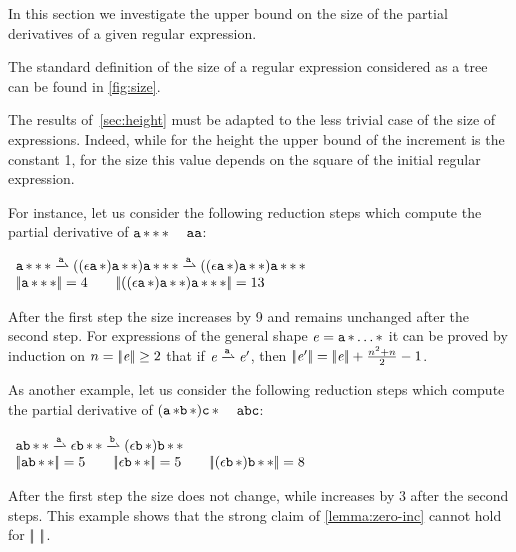 In this section we investigate the upper bound on the size of the partial derivatives of a given regular expression.

The standard definition of the size of a regular expression considered as a tree can be found in \cref{fig:size}.

The results of~\cref{sec:height} must be adapted to the less trivial case of the size of expressions. Indeed, while for the height the upper bound of the increment is the constant 1, for the size this value depends on the square of the initial regular expression.

For instance, let us consider the following reduction steps which compute the partial derivative of ${{{{{{\mathtt {a}}\mathop{*}}}\mathop{*}}}\mathop{*}}$
\wrt~ $\mathtt {a}\mathtt {a}$:
\begin{flushleft}
 $
  \begin{array}{l}
   \starop{\starop{\starop{\sym}}}\parDer{\sym}((\eps\catop\starop{\sym})\catop\starop{\starop{\sym}})\catop\starop{\starop{\starop{\sym}}}\parDer{\sym}((\eps\catop\starop{\sym})\catop\starop{\starop{\sym}})\catop\starop{\starop{\starop{\sym}}} \\
   \tsize{\starop{\starop{\starop{\sym}}}}=4\qquad  \tsize{((\eps\catop\starop{\sym})\catop\starop{\starop{\sym}})\catop\starop{\starop{\starop{\sym}}}}=13
  \end{array}
 $
\end{flushleft}
After the first step the size increases by 9 and remains unchanged after the second step.
For expressions of the general shape $\mathit {e}={{\mathtt {a}}\mathop{*}}\ldots*$ it can be proved by induction on $n={{\mid\!\mid}}{\mathit {e}}{{\mid\!\mid}}\geq 2$ that if $\re\parDer{\sym}\re'$, then
${{\mid\!\mid}}{\mathit {e}'}{{\mid\!\mid}}={{\mid\!\mid}}{\mathit {e}}{{\mid\!\mid}}+\frac{n^2+n}{2}-1$.

As another example, let us consider the following reduction steps which compute the partial derivative of $({{\mathtt {a}}\mathop{*}}{{\mathtt {b}}\mathop{*}}){{\mathtt {c}}\mathop{*}}$
\wrt~ $\mathtt {a}\mathtt {b}\mathtt {c}$:
\begin{flushleft}
 $
  \begin{array}{l}
   \sym\catop\starop{\starop{\asym}}\parDer{\sym}\eps\catop\starop{\starop{\asym}}\parDer{\asym}(\eps\catop\starop{\asym})\catop\starop{\starop{\asym}} \\
   \tsize{\sym\catop\starop{\starop{\asym}}}=5\qquad  \tsize{\eps\catop\starop{\starop{\asym}}}=5 \qquad \tsize{(\eps\catop\starop{\asym})\catop\starop{\starop{\asym}}}=8
  \end{array}
 $
\end{flushleft}
After the first step the size does not change, while increases by 3 after the second steps. This example shows that the strong claim of \cref{lemma:zero-inc} cannot hold for ${{\mid\!\mid}}{\ }{{\mid\!\mid}}$.

